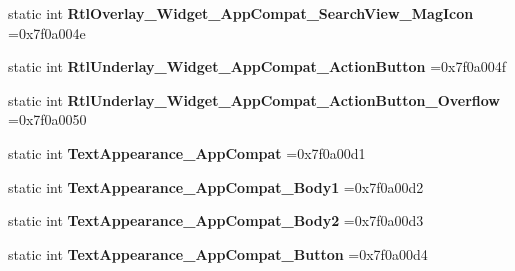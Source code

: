\begin{DoxyCompactItemize}
\item 
\mbox{\label{classandroid_1_1support_1_1v7_1_1recyclerview_1_1R_1_1style_a905744c3a8ac262a8ddcb510a9b96217}} 
static int {\bfseries Rtl\+Overlay\+\_\+\+Widget\+\_\+\+App\+Compat\+\_\+\+Search\+View\+\_\+\+Mag\+Icon} =0x7f0a004e
\item 
\mbox{\label{classandroid_1_1support_1_1v7_1_1recyclerview_1_1R_1_1style_a703fb471fdd67f977359b8f845d782cb}} 
static int {\bfseries Rtl\+Underlay\+\_\+\+Widget\+\_\+\+App\+Compat\+\_\+\+Action\+Button} =0x7f0a004f
\item 
\mbox{\label{classandroid_1_1support_1_1v7_1_1recyclerview_1_1R_1_1style_aac900566fbd49189c9d600696d65721e}} 
static int {\bfseries Rtl\+Underlay\+\_\+\+Widget\+\_\+\+App\+Compat\+\_\+\+Action\+Button\+\_\+\+Overflow} =0x7f0a0050
\item 
\mbox{\label{classandroid_1_1support_1_1v7_1_1recyclerview_1_1R_1_1style_a1afc6c31356529e6971a1d9b881881d8}} 
static int {\bfseries Text\+Appearance\+\_\+\+App\+Compat} =0x7f0a00d1
\item 
\mbox{\label{classandroid_1_1support_1_1v7_1_1recyclerview_1_1R_1_1style_a123276f3dda1874ccf44569dd033f04d}} 
static int {\bfseries Text\+Appearance\+\_\+\+App\+Compat\+\_\+\+Body1} =0x7f0a00d2
\item 
\mbox{\label{classandroid_1_1support_1_1v7_1_1recyclerview_1_1R_1_1style_aa378106743283a43fabb3afd74ac10fc}} 
static int {\bfseries Text\+Appearance\+\_\+\+App\+Compat\+\_\+\+Body2} =0x7f0a00d3
\item 
\mbox{\label{classandroid_1_1support_1_1v7_1_1recyclerview_1_1R_1_1style_a32acbedee8900a3c265eb928073eb229}} 
static int {\bfseries Text\+Appearance\+\_\+\+App\+Compat\+\_\+\+Button} =0x7f0a00d4
\item 
\mbox{\label{classandroid_1_1support_1_1v7_1_1recyclerview_1_1R_1_1style_ab79b1f601e57c534541f32bcecefe946}} 

\end{DoxyCompactItemize}
